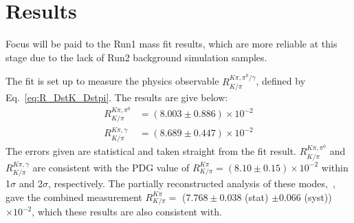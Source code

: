 \documentclass[oneside,12pt]{article}
\begin{document}
\section{Results} \label{sec:results}
\setlength{\abovedisplayskip}{2pt}
\setlength{\belowdisplayskip}{3pt}
\begin{table}[]
 \caption{{Signal yields and errors extracted from the 2D fit results for Run1,
then 2011-2017 data.}} \label{table:yields}
\end{table}

Focus will be paid to the Run1 mass fit results, which are more reliable at
this stage due to the lack of Run2 background simulation samples.

The fit is set up to measure the physics observable $R^{K\pi , \pi^0
/\gamma}_{K/\pi}$, defined by Eq.~\ref{eq:R_DstK_Dstpi}. The results are give
below:
\begin{align*}
R^{K\pi , \pi^0}_{K/\pi} &= (8.003 \pm 0.886) \times 10^{-2} \\
R^{K\pi , \gamma}_{K/\pi} &= (8.689 \pm 0.447) \times 10^{-2} 
\end{align*} 
The errors given are statistical and taken straight from the fit result.
$R^{K\pi , \pi^0}_{K/\pi}$ and $R^{K\pi , \gamma}_{K/\pi}$ are consistent with
the PDG value of $R^{K\pi}_{K/\pi} = (8.10 \pm 0.15) \times 10^{-2}$ within
1$\sigma$ and 2$\sigma$, respectively. The partially reconstructed analysis of
these modes,~\cite{PartReco}, gave the combined measurement $R^{K\pi}_{K/\pi}
=$ ($7.768 \pm 0.038$ (stat) $\pm 0.066$ (syst)) $\times 10^{-2}$, which these
results are also consistent with. 
\end{document}
